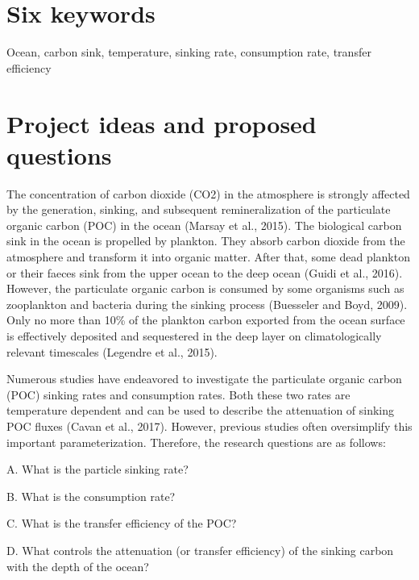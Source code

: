 \documentclass[11pt, a4paper]{article}
\begin{document}

\runninglinenumbers

\section{Six keywords}
Ocean, carbon sink, temperature, sinking rate, consumption rate, transfer efficiency

\section{Project ideas and proposed questions}
The concentration of carbon dioxide (CO2) in the atmosphere is strongly affected by the generation, sinking, and subsequent remineralization of the particulate organic carbon (POC) in the ocean (Marsay et al., 2015). The biological carbon sink in the ocean is propelled by plankton. They absorb carbon dioxide from the atmosphere and transform it into organic matter. After that, some dead plankton or their faeces sink from the upper ocean to the deep ocean (Guidi et al., 2016). However, the particulate organic carbon is consumed by some organisms such as zooplankton and bacteria during the sinking process (Buesseler and Boyd, 2009). Only no more than 10\% of the plankton carbon exported from the ocean surface is effectively deposited and sequestered in the deep layer on climatologically relevant timescales (Legendre et al., 2015).

Numerous studies have endeavored to investigate the particulate organic carbon (POC) sinking rates and consumption rates. Both these two rates are temperature dependent and can be used to describe the attenuation of sinking POC fluxes (Cavan et al., 2017). However, previous studies often oversimplify this important parameterization. Therefore, the research questions are as follows:

A. What is the particle sinking rate?

B. What is the consumption rate?

C. What is the transfer efficiency of the POC?

D. What controls the attenuation (or transfer efficiency) of the sinking carbon with the depth of the ocean?
  
\end{document}
